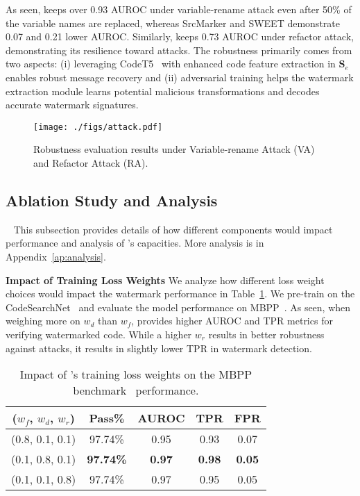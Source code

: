 As seen, \sys{} keeps over 0.93 AUROC under variable-rename attack even after 50\% of the variable names are replaced, whereas SrcMarker and SWEET demonstrate 0.07 and 0.21 lower AUROC. Similarly, \sys{} keeps 0.73 AUROC under refactor attack, demonstrating its resilience toward attacks. 
The robustness primarily comes from two aspects: (i) leveraging CodeT5~\cite{wang2021codet5} with enhanced code feature extraction in $\mathbf{S}_e$ enables robust message recovery and (ii) adversarial training helps the watermark extraction module learns potential malicious transformations and decodes accurate watermark signatures. 


\begin{figure}[!ht]
    \centering
    \texttt{[image: ./figs/attack.pdf]}
    \vspace{-5pt}
    \caption{Robustness evaluation results under Variable-rename Attack (VA) and Refactor Attack (RA).}
    \vspace{-5pt}
    \label{fig:attack}
\end{figure}


\subsection{Ablation Study and Analysis}~\label{subsec:ablation}
This subsection provides details of how different components would impact \sys{} performance and analysis of \sys's capacities. More analysis is in Appendix~\ref{ap:analysis}.

\textbf{Impact of Training Loss Weights} We analyze how different loss weight choices would impact the watermark performance in Table~\ref{tab:loss_weight}. We pre-train \sys{} on the CodeSearchNet~\cite{husain2019codesearchnet} and evaluate the model performance on MBPP~\cite{austin2021program}. As seen, when weighing more on $w_d$ than $w_f$, \sys{} provides higher AUROC and TPR metrics for verifying watermarked code. While a higher $w_r$ results in better robustness against attacks, it results in slightly lower TPR in watermark detection.

\begin{table}[h!]
    \centering
    \small
    \begin{tabular}{c|cccc}
    \toprule
     ($w_f$, $w_d$, $w_r$) &  Pass\% & AUROC & TPR & FPR  \\ \hline
     (0.8, 0.1, 0.1)    &  97.74\% & 0.95 & 0.93 & 0.07\\
     (0.1, 0.8, 0.1)    & \textbf{97.74\%} & \textbf{0.97} & \textbf{0.98} & \textbf{0.05}\\
     (0.1, 0.1, 0.8)    &  97.74\% & 0.97 & 0.95 & 0.05\\
    \bottomrule
    \end{tabular}
    \caption{Impact of \sys's training loss weights on the MBPP benchmark~\cite{austin2021program} performance.}
    \label{tab:loss_weight}
\end{table}

